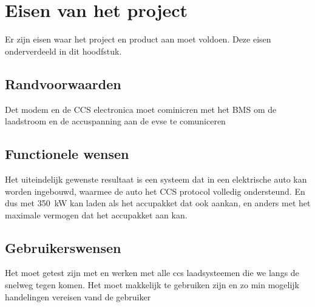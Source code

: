 \chapter{Eisen van het project}
\label{Eisen_van_het_project}

Er zijn eisen waar het project en product aan moet voldoen. Deze eisen
onderverdeeld in dit hoodfstuk.

\section{Randvoorwaarden}

Det modem en de CCS electronica moet cominicren met het BMS om de laadstroom en
de accuspanning aan de \ac{evse} te comuniceren

\section{Functionele wensen}

Het uiteindelijk gewenste resultaat is een systeem dat in een elektrische auto
kan worden ingebouwd, waarmee de auto het CCS protocol volledig ondersteund. En
dus met \si{350\kilo\watt} kan laden als het accupakket dat ook aankan, en
anders met het maximale vermogen dat het accupakket aan kan.

\section{Gebruikerswensen}

Het moet getest zijn met en werken met alle ccs laadsysteemen die we langs de
snelweg tegen komen. Het moet makkelijk te gebruiken zijn en zo min mogelijk
handelingen vereisen vand de gebruiker

